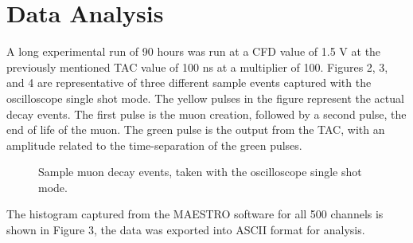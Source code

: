 \documentclass[%
 aip,
 amsmath,amssymb,
 reprint,%
floatfix,
]{revtex4-1}
\begin{document}
\section{\label{sec:level4}Data Analysis}

A long experimental run of 90 hours was run at a CFD value of 1.5 V at the previously mentioned TAC value of 100 ns at a multiplier of 100. Figures 2, 3, and 4 are representative of three different sample events captured with the oscilloscope single shot mode. The yellow pulses in the figure represent the actual decay events. The first pulse is the muon creation, followed by a second pulse, the end of life of the muon. The green pulse is the output from the TAC, with an amplitude related to the time-separation of the green pulses.

\begin{figure}[H]
	\centering
	\hfill
	\hfill
	\caption{Sample muon decay events, taken with the oscilloscope single shot mode.}
\end{figure}

The histogram captured from the MAESTRO software for all 500 channels is shown in Figure 3, the data was exported into ASCII format for analysis.
\end{document}
